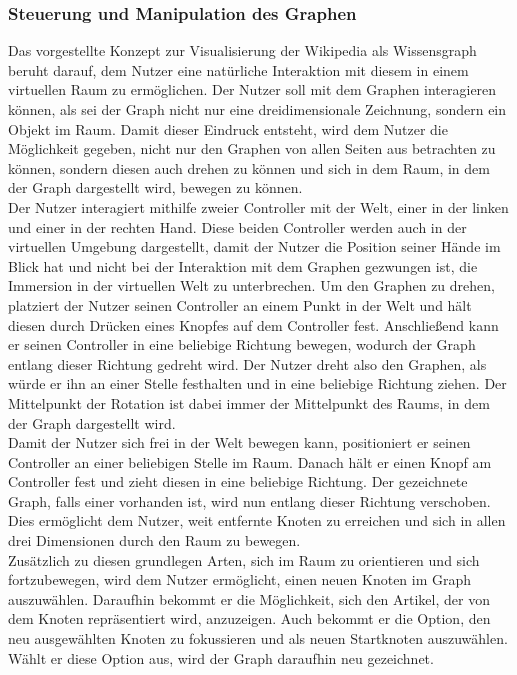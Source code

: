 \documentclass[12pt, a4paper]{article}
\begin{document}
\subsubsection{Steuerung und Manipulation des Graphen}
Das vorgestellte Konzept zur Visualisierung der Wikipedia als Wissensgraph beruht darauf, dem Nutzer eine natürliche Interaktion mit diesem in einem virtuellen Raum zu ermöglichen. Der Nutzer soll mit dem Graphen interagieren können, als sei der Graph nicht nur eine dreidimensionale Zeichnung, sondern ein Objekt im Raum. Damit dieser Eindruck entsteht, wird dem Nutzer die Möglichkeit gegeben, nicht nur den Graphen von allen Seiten aus betrachten zu können, sondern diesen auch drehen zu können und sich in dem Raum, in dem der Graph dargestellt wird, bewegen zu können.\\

Der Nutzer interagiert mithilfe zweier Controller mit der Welt, einer in der linken und einer in der rechten Hand. Diese beiden Controller werden auch in der virtuellen Umgebung dargestellt, damit der Nutzer die Position seiner Hände im Blick hat und nicht bei der Interaktion mit dem Graphen gezwungen ist, die Immersion in der virtuellen Welt zu unterbrechen. Um den Graphen zu drehen, platziert der Nutzer seinen Controller an einem Punkt in der Welt und hält diesen durch Drücken eines Knopfes auf dem Controller fest. Anschließend kann er seinen Controller in eine beliebige Richtung bewegen, wodurch der Graph entlang dieser Richtung gedreht wird. Der Nutzer dreht also den Graphen, als würde er ihn an einer Stelle festhalten und in eine beliebige Richtung ziehen. Der Mittelpunkt der Rotation ist dabei immer der Mittelpunkt des Raums, in dem der Graph dargestellt wird.\\

Damit der Nutzer sich frei in der Welt bewegen kann, positioniert er seinen Controller an einer beliebigen Stelle im Raum. Danach hält er einen Knopf am Controller fest und zieht diesen in eine beliebige Richtung. Der gezeichnete Graph, falls einer vorhanden ist, wird nun entlang dieser Richtung verschoben. Dies ermöglicht dem Nutzer, weit entfernte Knoten zu erreichen und sich in allen drei Dimensionen durch den Raum zu bewegen.\\

Zusätzlich zu diesen grundlegen Arten, sich im Raum zu orientieren und sich fortzubewegen, wird dem Nutzer ermöglicht, einen neuen Knoten im Graph auszuwählen. Daraufhin bekommt er die Möglichkeit, sich den Artikel, der von dem Knoten repräsentiert wird, anzuzeigen. Auch bekommt er die Option, den neu ausgewählten Knoten zu fokussieren und als neuen Startknoten auszuwählen. Wählt er diese Option aus, wird der Graph daraufhin neu gezeichnet.\\
\end{document}
